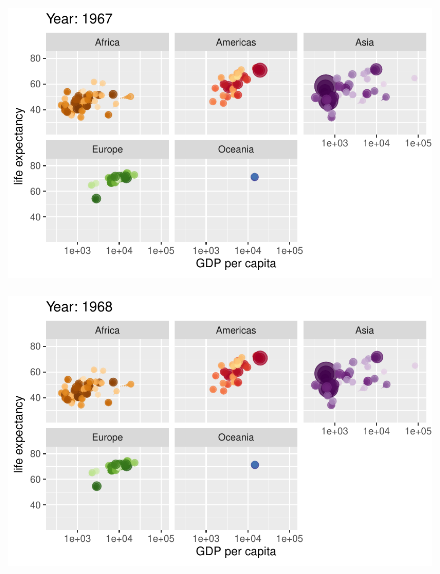 \documentclass[
  letterpaper,
  DIV=11,
  numbers=noendperiod]{scrartcl}
\begin{document}
\begin{figure}[H]

{\centering \includegraphics{class05_files/figure-pdf/unnamed-chunk-24-28.pdf}

}

\end{figure}

\begin{figure}[H]

{\centering \includegraphics{class05_files/figure-pdf/unnamed-chunk-24-29.pdf}

}

\end{figure}
\end{document}
